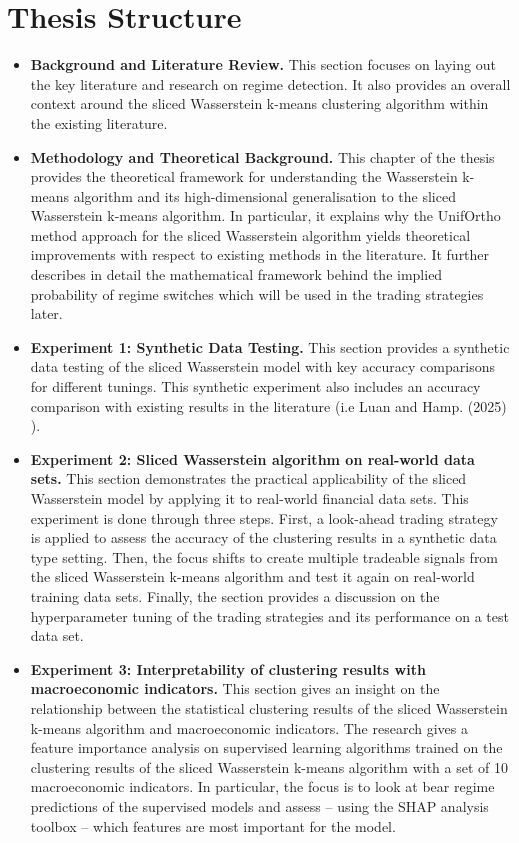 \documentclass[12pt,a4paper]{report}
\begin{document}
\section{Thesis Structure}
\begin{itemize}
  \item \textbf{Background and Literature Review.}
  This section focuses on laying out the key literature and research on regime detection. 
  It also provides an overall context around the sliced Wasserstein k-means clustering algorithm within the existing literature. 
  

  \item \textbf{Methodology and Theoretical Background.}
  This chapter of the thesis provides the theoretical framework for understanding the Wasserstein k-means algorithm and its high-dimensional generalisation to the sliced Wasserstein k-means algorithm.
  In particular, it explains why the UnifOrtho method approach for the sliced Wasserstein algorithm yields theoretical improvements with respect to existing methods in the literature.
  It further describes in detail the mathematical framework behind the implied probability of regime switches which will be used in the trading strategies later. 

  \item \textbf{Experiment 1: Synthetic Data Testing.}
  This section provides a synthetic data testing of the sliced Wasserstein model with key accuracy comparisons for different tunings.
  This synthetic experiment also includes an accuracy comparison with existing results in the literature (i.e Luan and Hamp. (2025) \cite{LuanHamp2025}).

  \item \textbf{Experiment 2: Sliced Wasserstein algorithm on real-world data sets.}
  This section demonstrates the practical applicability of the sliced Wasserstein model by applying it to real-world financial data sets. 
  This experiment is done through three steps. First, a look-ahead trading strategy is applied to assess the accuracy of the clustering results in a synthetic data type setting.
  Then, the focus shifts to create multiple tradeable signals from the sliced Wasserstein k-means algorithm and test it again on real-world training data sets.
  Finally, the section provides a discussion on the hyperparameter tuning of the trading strategies and its performance on a test data set.
  
  \item \textbf{Experiment 3: Interpretability of clustering results with macroeconomic indicators.}
  This section gives an insight on the relationship between the statistical clustering results of the sliced Wasserstein k-means algorithm and macroeconomic indicators.
  The research gives a feature importance analysis on supervised learning algorithms trained on the clustering results of the sliced Wasserstein k-means algorithm with a set of 10 macroeconomic indicators.
  In particular, the focus is to look at bear regime predictions of the supervised models and assess -- using the SHAP analysis toolbox -- which features are most important for the model.
  

\end{itemize}
\end{document}
